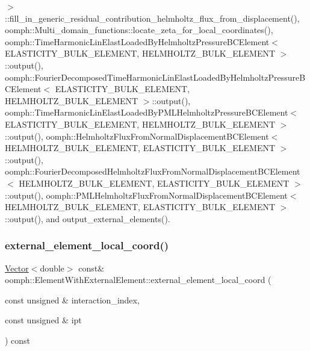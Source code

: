 $>$\+::fill\+\_\+in\+\_\+generic\+\_\+residual\+\_\+contribution\+\_\+helmholtz\+\_\+flux\+\_\+from\+\_\+displacement(), oomph\+::\+Multi\+\_\+domain\+\_\+functions\+::locate\+\_\+zeta\+\_\+for\+\_\+local\+\_\+coordinates(), oomph\+::\+Time\+Harmonic\+Lin\+Elast\+Loaded\+By\+Helmholtz\+Pressure\+B\+C\+Element$<$ E\+L\+A\+S\+T\+I\+C\+I\+T\+Y\+\_\+\+B\+U\+L\+K\+\_\+\+E\+L\+E\+M\+E\+N\+T, H\+E\+L\+M\+H\+O\+L\+T\+Z\+\_\+\+B\+U\+L\+K\+\_\+\+E\+L\+E\+M\+E\+N\+T $>$\+::output(), oomph\+::\+Fourier\+Decomposed\+Time\+Harmonic\+Lin\+Elast\+Loaded\+By\+Helmholtz\+Pressure\+B\+C\+Element$<$ E\+L\+A\+S\+T\+I\+C\+I\+T\+Y\+\_\+\+B\+U\+L\+K\+\_\+\+E\+L\+E\+M\+E\+N\+T, H\+E\+L\+M\+H\+O\+L\+T\+Z\+\_\+\+B\+U\+L\+K\+\_\+\+E\+L\+E\+M\+E\+N\+T $>$\+::output(), oomph\+::\+Time\+Harmonic\+Lin\+Elast\+Loaded\+By\+P\+M\+L\+Helmholtz\+Pressure\+B\+C\+Element$<$ E\+L\+A\+S\+T\+I\+C\+I\+T\+Y\+\_\+\+B\+U\+L\+K\+\_\+\+E\+L\+E\+M\+E\+N\+T, H\+E\+L\+M\+H\+O\+L\+T\+Z\+\_\+\+B\+U\+L\+K\+\_\+\+E\+L\+E\+M\+E\+N\+T $>$\+::output(), oomph\+::\+Helmholtz\+Flux\+From\+Normal\+Displacement\+B\+C\+Element$<$ H\+E\+L\+M\+H\+O\+L\+T\+Z\+\_\+\+B\+U\+L\+K\+\_\+\+E\+L\+E\+M\+E\+N\+T, E\+L\+A\+S\+T\+I\+C\+I\+T\+Y\+\_\+\+B\+U\+L\+K\+\_\+\+E\+L\+E\+M\+E\+N\+T $>$\+::output(), oomph\+::\+Fourier\+Decomposed\+Helmholtz\+Flux\+From\+Normal\+Displacement\+B\+C\+Element$<$ H\+E\+L\+M\+H\+O\+L\+T\+Z\+\_\+\+B\+U\+L\+K\+\_\+\+E\+L\+E\+M\+E\+N\+T, E\+L\+A\+S\+T\+I\+C\+I\+T\+Y\+\_\+\+B\+U\+L\+K\+\_\+\+E\+L\+E\+M\+E\+N\+T $>$\+::output(), oomph\+::\+P\+M\+L\+Helmholtz\+Flux\+From\+Normal\+Displacement\+B\+C\+Element$<$ H\+E\+L\+M\+H\+O\+L\+T\+Z\+\_\+\+B\+U\+L\+K\+\_\+\+E\+L\+E\+M\+E\+N\+T, E\+L\+A\+S\+T\+I\+C\+I\+T\+Y\+\_\+\+B\+U\+L\+K\+\_\+\+E\+L\+E\+M\+E\+N\+T $>$\+::output(), and output\+\_\+external\+\_\+elements().

\mbox{\label{classoomph_1_1ElementWithExternalElement_af9da1e0b0cc58d18e32967763a697765}} 
\subsubsection{\texorpdfstring{external\+\_\+element\+\_\+local\+\_\+coord()}{external\_element\_local\_coord()}\hspace{0.1cm}{\footnotesize\ttfamily [2/2]}}
{\footnotesize\ttfamily \hyperlink{classoomph_1_1Vector}{Vector}$<$double$>$ const\& oomph\+::\+Element\+With\+External\+Element\+::external\+\_\+element\+\_\+local\+\_\+coord (\begin{DoxyParamCaption}\item[{const unsigned \&}]{interaction\+\_\+index,  }\item[{const unsigned \&}]{ipt }\end{DoxyParamCaption}) const\hspace{0.3cm}{\ttfamily [inline]}}



